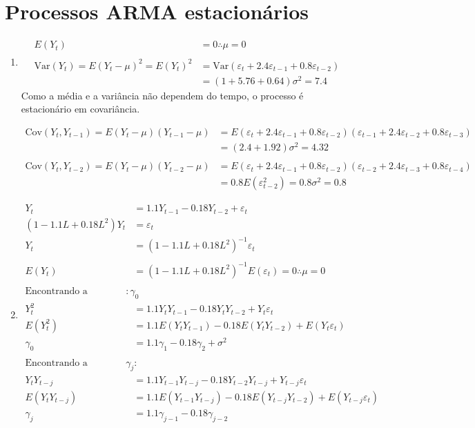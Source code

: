 \chapter{Processos ARMA estacionários}

\begin{enumerate}
	\item %
		\begin{align*}
		E(Y_t)&=0 \therefore \mu=0\\
		\\
		\text{Var}(Y_t)=E(Y_t-\mu)^2=E(Y_t)^2&=\text{Var}(\varepsilon_t+2.4\varepsilon_{t-1}+0.8\varepsilon_{t-2})\\
		&=(1+5.76+0.64)\sigma^2=7.4
		\end{align*}
		Como a média e a variância não dependem do tempo, o processo é estacionário em covariância.
		
		\begin{align*}
		\text{Cov}(Y_t,Y_{t-1})=E(Y_t-\mu)(Y_{t-1}-\mu)&=E(\varepsilon_t+2.4\varepsilon_{t-1}+0.8\varepsilon_{t-2})(\varepsilon_{t-1}+2.4\varepsilon_{t-2}+0.8\varepsilon_{t-3})\\
		&=(2.4+1.92)\sigma^2=4.32\\
		\\
		\text{Cov}(Y_t,Y_{t-2})=E(Y_t-\mu)(Y_{t-2}-\mu)&=E(\varepsilon_t+2.4\varepsilon_{t-1}+0.8\varepsilon_{t-2})(\varepsilon_{t-2}+2.4\varepsilon_{t-3}+0.8\varepsilon_{t-4})\\
		&=0.8E(\varepsilon_{t-2}^2)=0.8\sigma^2=0.8
		\end{align*}
		
		\item %
		\begin{align*}
			Y_t&=1.1Y_{t-1}-0.18Y_{t-2}+\varepsilon_t\\
			(1-1.1L+0.18L^2)Y_t&=\varepsilon_t\\
			Y_t&=(1-1.1L+0.18L^2)^{-1}\varepsilon_t\\
			\\
			E(Y_t)&=(1-1.1L+0.18L^2)^{-1}E(\varepsilon_t)=0 \therefore \mu=0\\
			\\
			\text{Encontrando a variância }:\gamma_0\\
			Y_t^2&=1.1Y_tY_{t-1}-0.18Y_tY_{t-2}+Y_t\varepsilon_t\\
			E(Y_t^2)&=1.1E(Y_tY_{t-1})-0.18E(Y_tY_{t-2})+E(Y_t\varepsilon_t)\\
			\gamma_0&=1.1\gamma_1-0.18\gamma_2+\sigma^2\\
			\\
			\text{Encontrando a autocovariância } \gamma_j:\\
			Y_tY_{t-j}&=1.1Y_{t-1}Y_{t-j}-0.18Y_{t-2}Y_{t-j}+Y_{t-j}\varepsilon_t\\
			E(Y_tY_{t-j})&=1.1E(Y_{t-1}Y_{t-j})-0.18E(Y_{t-j}Y_{t-2})+E(Y_{t-j}\varepsilon_t)\\
			\gamma_j&=1.1\gamma_{j-1}-0.18\gamma_{j-2}\\
		\end{align*}
		

\end{enumerate}
